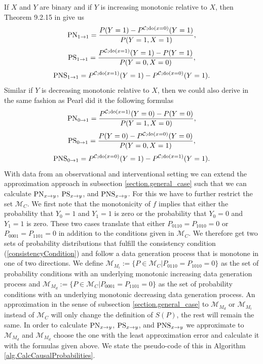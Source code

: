\documentclass[letterpaper]{article}
\newcommand{\kC}{\mathcal{C}}   %
\newcommand{\kM}{\mathcal{M}}   %
\newcommand{\DO}{{\rm do}}
\newcommand{\PN}{{\rm PN}}
\newcommand{\PS}{{\rm PS}}
\newcommand{\PNS}{{\rm PNS}}
\begin{document}
If $X$ and $Y$ are binary and if $Y$ is increasing monotonic relative to $X$, then Theorem 9.2.15 in \cite{Pea09} give us
\begin{equation} \label{eq.PN_incr}
\PN_{1\rightarrow 1} = \frac{P(Y=1) - P^{\kC; \DO(x=0)}(Y=1)}{P(Y=1, X=1)},
\end{equation}
\begin{equation} \label{eq.PS_incr}
\PS_{1\rightarrow 1} = \frac{P^{\kC; \DO(x=1)}(Y=1) - P(Y=1)}{P(Y=0,X=0)},
\end{equation}
\begin{equation} \label{eq.PNS_incr}
\PNS_{1\rightarrow 1} = P^{\kC; \DO(x=1)}(Y=1) - P^{\kC; \DO(x=0)}(Y=1).
\end{equation}
Similar if $Y$ is decreasing monotonic relative to $X$, then we could also derive in the same fashion as Pearl did it the following formulas
\begin{equation} \label{eq.PN_decr}
\PN_{0\rightarrow 1} = \frac{P^{\kC; \DO(x=1)}(Y=0)- P(Y=0)}{P(Y=1, X=0)},
\end{equation}
\begin{equation} \label{eq.PS_decr}
\PS_{0\rightarrow 1} = \frac{P(Y=0)-P^{\kC; \DO(x=0)}(Y=0)}{P(Y=0,X=1)},
\end{equation}
\begin{equation}\label{eq.PNS_decr}
\PNS_{0\rightarrow 1} = P^{\kC; \DO(x=0)}(Y=1) - P^{\kC; \DO(x=1)}(Y=1).
\end{equation}
With data from an observational and interventional setting we can extend the approximation approach in subsection \ref{section.general_case} such that we can calculate $\PN_{x\rightarrow y}$, $\PS_{x\rightarrow y}$, and $\PNS_{x\rightarrow y}$. For this we have to further restrict the set $\kM_C$. We first note that the monotonicity of $f$ implies that either the probability that $Y_0=1$ and $Y_1=1$ is zero or the probability that $Y_0=0$ and $Y_1=1$ is zero. These two cases translate that either $P_{0110} = P_{1010} = 0$ or $P_{0001} = P_{1101}=0$ in addition to the conditions given in $\kM_C$. We therefore get two sets of probability distributions that fulfill the consistency condition (\ref{consistencyCondition}) and follow a data generation process that is monotone in one of two directions. We define
$\kM_{M_i} := \{P \in \kM_C | P_{0110} = P_{1010} = 0\}$ as the set of probability conditions with an underlying monotonic increasing data generation process and $\kM_{M_d} := \{P \in \kM_C | P_{0001} = P_{1101} = 0\}$ as the set of probability conditions with an underlying monotonic decreasing data generation process.
An approximation in the sense of subsection \ref{section.general_case} to $\kM_{M_d}$ or $\kM_{M_i}$ instead of $\kM_C$ will only change the definition of $S(P)$, the rest will remain the same. In order to calculate $\PN_{x\rightarrow y}$, $\PS_{x\rightarrow y}$, and $\PNS_{x\rightarrow y}$ we approximate to $\kM_{M_d}$ and $\kM_{M_d}$ choose the one with the least approximation error and calculate it with the formulas given above. We state the pseudo-code of this in Algorithm \ref{alg.CalcCausalProbabilities}.
\end{document}
